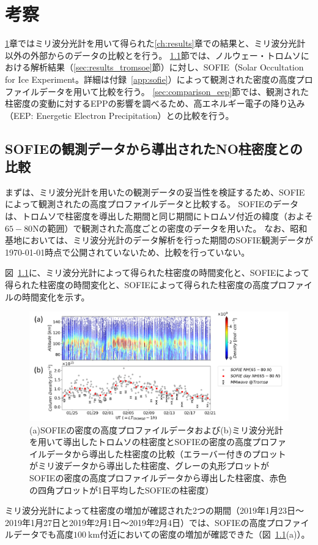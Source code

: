 \chapter{考察}
\label{ch:discussion}
\ref{ch:discussion}章ではミリ波分光計を用いて得られた\ref{ch:results}章での結果と、ミリ波分光計以外の外部からのデータの比較とを行う。
\ref{sec:comparison_sofie}節では、ノルウェー・トロムソにおける解析結果（\ref{sec:results_tromsoe}節）に対し、SOFIE（Solar Occultation for Ice Experiment。詳細は付録~\ref{app:sofie}）によって観測された密度の高度プロファイルデータを用いて比較を行う。
\ref{sec:comparison_eep}節では、観測された柱密度の変動に対するEPPの影響を調べるため、高エネルギー電子の降り込み（EEP: Energetic Electron Precipitation）との比較を行う。


\section{SOFIEの観測データから導出されたNO柱密度との比較}
\label{sec:comparison_sofie}
まずは、ミリ波分光計を用いたの観測データの妥当性を検証するため、SOFIEによって観測されたの高度プロファイルデータと比較する。
SOFIEのデータは、トロムソで柱密度を導出した期間と同じ期間にトロムソ付近の緯度（およそ$65 - 80$\textdegree Nの範囲）で観測された高度ごとの密度のデータを用いた。
なお、昭和基地においては、ミリ波分光計のデータ解析を行った期間のSOFIE観測データが\today 時点で公開されていないため、比較を行っていない。\par

図~\ref{fig:sofie_mmcd}に、ミリ波分光計によって得られた柱密度の時間変化と、SOFIEによって得られた柱密度の時間変化と、SOFIEによって得られた柱密度の高度プロファイルの時間変化を示す。
\begin{figure}[htbp]
    \centering
    \includegraphics[width=\linewidth]{master_thesis_contents/master_thesis_fig/sofie_mmcd.pdf}
    \caption{(a)SOFIEの密度の高度プロファイルデータおよび(b)ミリ波分光計を用いて導出したトロムソの柱密度とSOFIEの密度の高度プロファイルデータから導出した柱密度の比較（エラーバー付きのプロットがミリ波データから導出した柱密度、グレーの丸形プロットがSOFIEの密度の高度プロファイルデータから導出した柱密度、赤色の四角プロットが1日平均したSOFIEの柱密度）}
    \label{fig:sofie_mmcd}
\end{figure}
ミリ波分光計によって柱密度の増加が確認された2つの期間（2019年1月23日〜2019年1月27日と2019年2月1日〜2019年2月4日）では、SOFIEの高度プロファイルデータでも高度$100\ \mathrm{km}$付近においての密度の増加が確認できた（図~\ref{fig:sofie_mmcd}(a)）。\par

